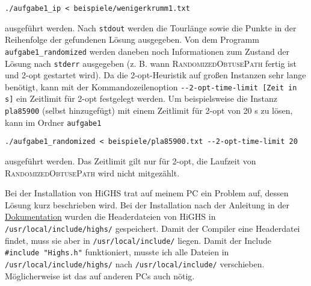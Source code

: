 \documentclass[a4paper, 10pt, ngerman]{article}
\begin{document}
\medskip
\verb|./aufgabe1_ip < beispiele/wenigerkrumm1.txt|
\medskip

\noindent ausgeführt werden. Nach \verb|stdout| werden die Tourlänge sowie die Punkte in der Reihenfolge der gefundenen Lösung ausgegeben. Von dem Programm \verb|aufgabe1_randomized| werden daneben noch Informationen zum Zustand der Lösung nach \verb|stderr| ausgegeben (z. B. wann \textsc{RandomizedObtusePath} fertig ist und 2-opt gestartet wird). Da die 2-opt-Heuristik auf großen Instanzen sehr lange benötigt, kann mit der Kommandozeilenoption \verb|--2-opt-time-limit [Zeit in s]| ein Zeitlimit für 2-opt festgelegt werden. Um beispielsweise die Instanz \verb|pla85900| (selbst hinzugefügt) mit einem Zeitlimit für 2-opt von 20 s zu lösen, kann im Ordner \verb|aufgabe1|

\medskip
\verb|./aufgabe1_randomized < beispiele/pla85900.txt --2-opt-time-limit 20|
\medskip

ausgeführt werden. Das Zeitlimit gilt nur für 2-opt, die Laufzeit von \textsc{RandomizedObtusePath} wird nicht mitgezählt.

Bei der Installation von HiGHS trat auf meinem PC ein Problem auf, dessen Lösung kurz beschrieben wird. Bei der Installation nach der Anleitung in der \href{https://ergo-code.github.io/HiGHS/dev/}{Dokumentation} wurden die Headerdateien von HiGHS in \verb|/usr/local/include/highs/| gespeichert. Damit der Compiler eine Headerdatei findet, muss sie aber in \verb|/usr/local/include/| liegen. Damit der Include \verb|#include "Highs.h"| funktioniert, musste ich alle Dateien in \verb|/usr/local/include/highs/| nach \verb|/usr/local/include/| verschieben. Möglicherweise ist das auf anderen PCs auch nötig.
\end{document}
